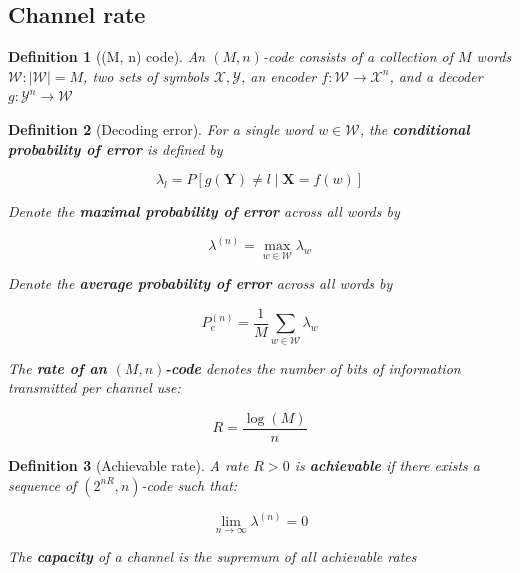 \documentclass{article}
\newcommand{\norm}[1]{\vert {#1} \vert}
\newtheorem{definition}{Definition}[section]
\begin{document}
    \subsection{Channel rate}
    \begin{definition}[(M, n) code]
        An $(M, n)$-code consists of a collection of $M$ words $\mathcal{W}: \norm{\mathcal{W}} = M$, two sets of symbols $\mathcal{X}, \mathcal{Y}$, an encoder $f: \mathcal{W} \rightarrow \mathcal{X}^n$, and a decoder $g: \mathcal{Y}^n \rightarrow \mathcal{W}$
    \end{definition}

    \begin{definition}[Decoding error]
        For a single word $w \in \mathcal{W}$, the \textbf{conditional probability of error} is defined by

        \begin{equation*}
            \lambda_l = P[g(\mathbf{Y}) \neq l \mid \mathbf{X} = f(w)]
        \end{equation*}

        Denote the \textbf{maximal probability of error} across all words by

        \begin{equation*}
            \lambda^(n) = \max_{w \in \mathcal{W}} \lambda_w
        \end{equation*}

        Denote the \textbf{average probability of error} across all words by

        \begin{equation*}
            P_e^{(n)} = \frac{1}{M}\sum_{w \in \mathcal{W}}\lambda_w
        \end{equation*}

        The \textbf{rate of an $(M, n)$-code} denotes the number of bits of information transmitted per channel use:

        \begin{equation*}
            R = \frac{\log(M)}{n}
        \end{equation*}
    \end{definition}

    \begin{definition}[Achievable rate]
        A rate $R > 0$ is \textbf{achievable} if there exists a sequence of $(2^{nR}, n)$-code such that:

        \begin{equation*}
            \lim_{n \rightarrow \infty}\lambda^{(n)} = 0
        \end{equation*}

        The \textbf{capacity} of a channel is the supremum of all achievable rates
    \end{definition}
\end{document}
